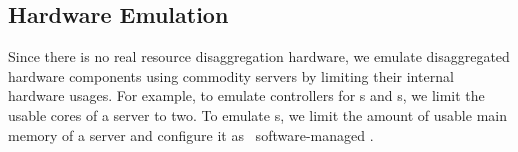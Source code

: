 \documentclass[10pt,times,twocolumn]{z2-article}
\begin{document}
{{{{{{{%




\subsection{Hardware Emulation}
Since there is no real resource disaggregation hardware,
we emulate disaggregated hardware components using commodity servers 
by limiting their internal hardware usages.
For example, to emulate controllers for \mcomponent{}s and \scomponent{}s, 
we limit the usable cores of a server to two.
To emulate \pcomponent{}s, we limit the amount of usable main memory of a server
and configure it as \lego\ software-managed \excache.


}}}}}}}
\end{document}
